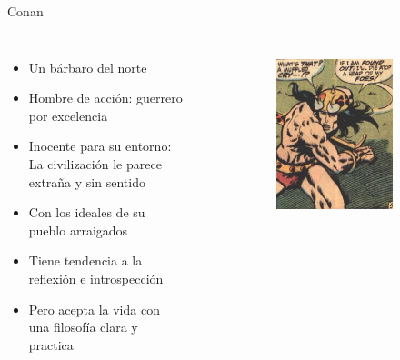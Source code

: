 \begin{frame}{Conan}
	\begin{columns}
		\begin{itemize}
			\item Un bárbaro del norte
			\item Hombre de acción: guerrero por excelencia
			\item Inocente para su entorno: La civilización le parece extraña y sin sentido
			\item Con los ideales de su pueblo arraigados
			\item Tiene tendencia a la reflexión e introspección
			\item Pero acepta la vida con una filosofía clara y practica
		\end{itemize}
		\begin{figure}[htp]
			\centering
			\begin{subfigure}[b]{0.3\textwidth}
				\includegraphics[width=\textwidth]{img/conan/CTB}

\end{subfigure}
\end{figure}
\end{columns}
\end{frame}
